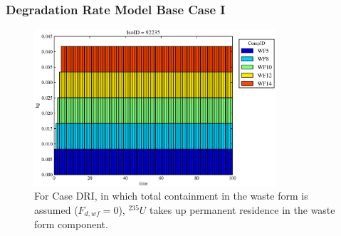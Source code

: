 

\begin{frame}[ctb!]
  \frametitle{Degradation Rate Model Base Case I}
\begin{figure}[ht]
\centering
\includegraphics[width=0.8\textwidth]{./images/drI.eps}
\caption[$^{235}U$ residence. Degradation Rate Waste Form No Release.]{
For Case DRI, in which total containment in the waste form is assumed ($F_{d,wf}=0$), 
$^{235}U$ takes up permanent residence in the waste form component.
}
\label{fig:drIall}
\end{figure}
\end{frame}

